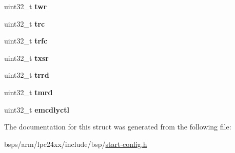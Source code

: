 \begin{DoxyCompactItemize}
uint32\+\_\+t {\bfseries twr}
\item 
\mbox{\label{structlpc24xx__emc__dynamic__config_a52fba340d275fe6b5a027648bf8ef459}} 
uint32\+\_\+t {\bfseries trc}
\item 
\mbox{\label{structlpc24xx__emc__dynamic__config_afa9b4d6d6be0ef9b5bb119772bcd7354}} 
uint32\+\_\+t {\bfseries trfc}
\item 
\mbox{\label{structlpc24xx__emc__dynamic__config_a269741870b3502a3e8948986767dc082}} 
uint32\+\_\+t {\bfseries txsr}
\item 
\mbox{\label{structlpc24xx__emc__dynamic__config_a890a62dce511ff17e3bd381add0185fe}} 
uint32\+\_\+t {\bfseries trrd}
\item 
\mbox{\label{structlpc24xx__emc__dynamic__config_af678f3576aee36099f4a0c998e1ff0cc}} 
uint32\+\_\+t {\bfseries tmrd}
\item 
\mbox{\label{structlpc24xx__emc__dynamic__config_a1c99197ec7d5a8080ae052a0f5671181}} 
uint32\+\_\+t {\bfseries emcdlyctl}
\end{DoxyCompactItemize}


The documentation for this struct was generated from the following file\+:\begin{DoxyCompactItemize}
\item 
bsps/arm/lpc24xx/include/bsp/\mbox{\hyperlink{start-config_8h}{start-\/config.\+h}}\end{DoxyCompactItemize}
